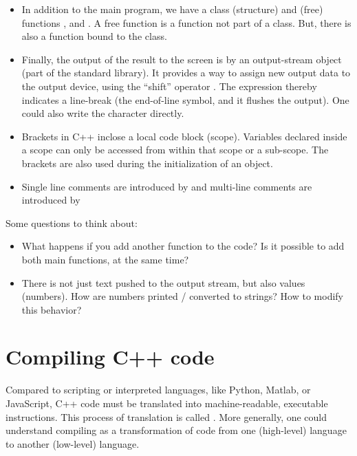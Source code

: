 \begin{itemize}
  \item In addition to the main program, we have a class (structure)  and (free) functions , and . A free function is a function not part of a class. But, there is also a function bound to the class.

  \item Finally, the output of the result to the screen is by an output-stream object  (part of the standard library). It provides a way to assign new output data to the output device, using the ``shift'' operator \cpp{<<}. The expression  thereby indicates a line-break (the end-of-line symbol, and it flushes the output). One could also write the character  directly.

  \item Brackets \cpp{{ }} in C++ inclose a local code block (scope). Variables declared inside a scope can only be accessed from within that scope or a sub-scope. The brackets are also used during the initialization of an object.

  \item Single line comments are introduced by \cpp{//} and multi-line comments are introduced by 
\end{itemize}

Some questions to think about:
\begin{itemize}
  \item What happens if you add another  function to the code? Is it possible to add both main functions,  at the same time?

  \item There is not just text pushed to the output stream, but also values (numbers). How are numbers printed / converted to strings? How to modify this behavior?
\end{itemize}


\section{Compiling C++ code\label{sec:compiling}}
Compared to scripting or interpreted languages, like Python, Matlab, or JavaScript, C++ code must be translated into machine-readable, executable instructions. This process of translation is called . More generally, one could understand compiling as a transformation of code from one (high-level) language to another (low-level) language.

